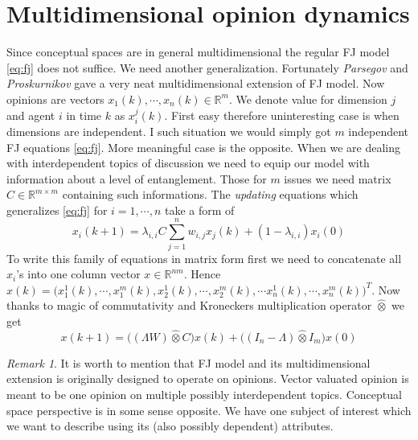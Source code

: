 \documentclass[leqno,12pt]{amsart}
\theoremstyle{remark}
\newtheorem{remark}[theorem]{Remark}
\theoremstyle{remark}
\theoremstyle{remark}
\theoremstyle{definition}
\numberwithin{equation}{section}
\newcommand{\R}{\ensuremath{\mathbb{R}}}
\begin{document}
\section{Multidimensional opinion dynamics}
Since conceptual spaces are in general multidimensional the regular FJ model \ref{eq:fj} does not suffice. We need another generalization. Fortunately \textit{Parsegov} and \textit{Proskurnikov} \cite{bib:parsegov} gave a very neat multidimensional extension of FJ model.
Now opinions are vectors $x_1(k), \cdots , x_n(k) \in \R^m$. We denote value for dimension $j$ and agent $i$ in time $k$ as $x^j_i(k)$. First easy therefore uninteresting case is when dimensions are independent. I such situation we would simply got $m$ independent FJ equations \ref{eq:fj}.
More meaningful case is the opposite. When we are dealing with interdependent topics of discussion we need to equip our model with information about a level of entanglement. Those for $m$ issues we need matrix $C\in\R^{m\times m}$ containing such informations.
The \textit{updating} equations which generalizes \ref{eq:fj} for $i = 1, \cdots, n$ take a form of 
\begin{equation}\label{eq:mfjs}
    x_i(k+1)=\lambda_{i,i}C\sum\limits^n_{j=1}w_{i,j}x_j(k)+(1-\lambda_{i,i})x_i(0)
\end{equation} 
To write this family of equations in matrix form first we need to concatenate all $x_i$'s into one column vector $x \in \R^{nm}$. Hence $x(k) = \big( x^1_1(k),\cdots , x^m_1(k), x^1_2(k), \cdots , x^m_2(k), \cdots x^1_n(k), \cdots , x^m_n(k) \big)^T$. Now thanks to magic of commutativity and Kroneckers multiplication operator $\hat\otimes$ we get
\begin{equation}\label{eq:mfj}
    x(k+1) = \big((\Lambda W) \hat\otimes C\big)x(k) + \big((I_n - \Lambda)\hat\otimes I_m\big)x(0)
\end{equation} 
\begin{remark}
    It is worth to mention that FJ model and its multidimensional extension is originally designed to operate on opinions.  Vector valuated opinion is meant to be one opinion on multiple possibly interdependent topics. Conceptual space perspective is in some sense opposite. We have one subject of interest which we want to describe using its (also possibly dependent) attributes.
\end{remark}
\end{document}
